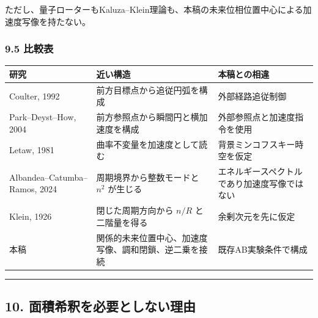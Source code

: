 \documentclass[
  a4paper,
]{ltjsarticle}
\newcounter{none} %
\begin{document}
ただし、量子ローターもKaluza--Klein理論も、本稿の未来位相位置中心による加速度写像を持たない。

\subsubsection{9.5 比較表}\label{ux6bd4ux8f03ux8868}

{\def\LTcaptype{none} %
\begin{longtable}[]{@{}
  >{\raggedright\arraybackslash}p{}
  >{\raggedright\arraybackslash}p{}
  >{\raggedright\arraybackslash}p{}@{}}
\toprule\noalign{}
\begin{minipage}[b]{\linewidth}\raggedright
研究
\end{minipage} & \begin{minipage}[b]{\linewidth}\raggedright
近い構造
\end{minipage} & \begin{minipage}[b]{\linewidth}\raggedright
本稿との相違
\end{minipage} \\
\midrule\noalign{}
\endhead
\bottomrule\noalign{}
\endlastfoot
Coulter, 1992 & 前方目標点から追従円弧を構成 & 外部経路追従制御 \\
Park--Deyst--How, 2004 & 前方参照点から瞬間円と横加速度を構成 &
外部参照点と加速度指令を使用 \\
Letaw, 1981 & 曲率不変量を加速度として読む &
背景ミンコフスキー時空を仮定 \\
Albandea--Catumba--Ramos, 2024 & 周期境界から整数モードと \(n^2\)
が生じる & エネルギースペクトルであり加速度写像ではない \\
Klein, 1926 & 閉じた周期方向から \(n/R\) と二階量を得る &
余剰次元を先に仮定 \\
本稿 & 関係的未来位置中心、加速度写像、調和閉鎖、逆二乗を接続 &
既存AB実験条件で構成 \\
\end{longtable}
}

\begin{center}\rule{0.5\linewidth}{0.5pt}\end{center}

\subsection{10.
面積希釈を必要としない理由}\label{ux9762ux7a4dux5e0cux91c8ux3092ux5fc5ux8981ux3068ux3057ux306aux3044ux7406ux7531}
\end{document}
